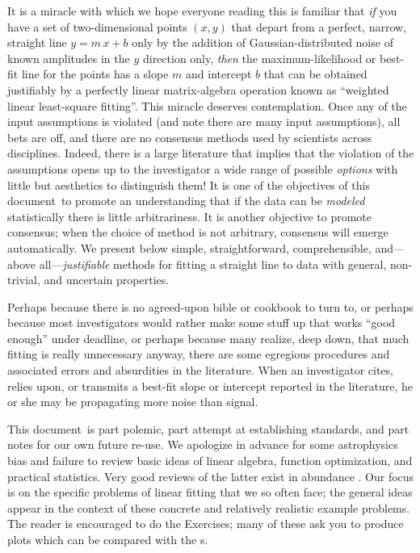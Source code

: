 \documentclass[12pt,twoside]{article}
\newcommand{\documentname}{document}
\newcommand{\problemname}{Exercise}
\newcounter{problem}
\begin{document}
It is a miracle with which we hope everyone reading this is familiar
that \emph{if} you have a set of two-dimensional points $(x,y)$ that
depart from a perfect, narrow, straight line $y=m\,x+b$ only by the
addition of Gaussian-distributed noise of known amplitudes in the $y$
direction only, \emph{then} the maximum-likelihood or best-fit line
for the points has a slope $m$ and intercept $b$ that can be obtained
justifiably by a perfectly linear matrix-algebra operation known as
``weighted linear least-square fitting''.  This miracle deserves
contemplation.  Once any of the input assumptions is violated (and
note there are many input assumptions), all bets are off, and there
are no consensus methods used by scientists across disciplines.
Indeed, there is a large literature that implies that the violation of
the assumptions opens up to the investigator a wide range of possible
\emph{options} with little but aesthetics to distinguish them!  It is
one of the objectives of this \documentname\ to promote an
understanding that if the data can be \emph{modeled} statistically
there is little arbitrariness.  It is another objective to promote
consensus; when the choice of method is not arbitrary, consensus will
emerge automatically.  We present below simple, straightforward,
comprehensible, and---above all---\emph{justifiable} methods for
fitting a straight line to data with general, non-trivial, and
uncertain properties.

Perhaps because there is no agreed-upon bible or cookbook to turn to,
or perhaps because most investigators would rather make some stuff up
that works ``good enough'' under deadline, or perhaps because many
realize, deep down, that much fitting is really unnecessary anyway,
there are some egregious procedures and associated errors and
absurdities in the literature.  When an investigator cites, relies upon,
or transmits a best-fit slope or intercept reported in the literature,
he or she may be propagating more noise than signal.

This \documentname\ is part polemic, part attempt at establishing standards,
and part notes for our own future re-use.  We apologize in advance for
some astrophysics bias and failure to review basic ideas of linear
algebra, function optimization, and practical statistics.  Very good
reviews of the latter exist in abundance \citep{mackay,press}.
Our focus is on the specific problems of linear fitting that we so
often face; the general ideas appear in the context of these concrete
and relatively realistic example problems.  The reader is encouraged
to do the \problemname s; many of these ask you to produce plots which
can be compared with the \figurename s.
\end{document}
